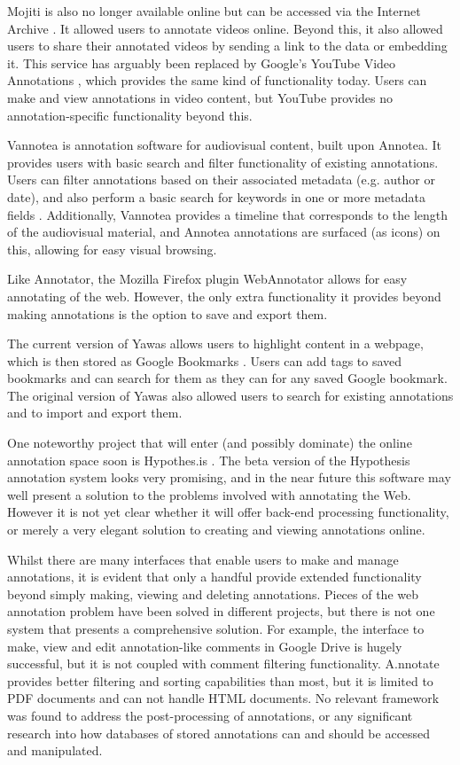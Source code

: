 Mojiti \citep{Mojiti} is also no longer available online but can be accessed via the Internet Archive \citep{InternetArchive}. It allowed users to annotate videos online. Beyond this, it also allowed users to share their annotated videos by sending a link to the data or embedding it. This service has arguably been replaced by Google's YouTube Video Annotations \citep{YouTubeAnns}, which provides the same kind of functionality today. Users can make and view annotations in video content, but YouTube provides no annotation-specific functionality beyond this. 

Vannotea \citep{Vannotea} is annotation software for audiovisual content, built upon Annotea. It provides users with basic search and filter functionality of existing annotations. Users can filter annotations based on their associated metadata (e.g. author or date), and also perform a basic search for keywords in one or more metadata fields \citep{AnnoteaSidebarDoc}. Additionally, Vannotea provides a timeline that corresponds to the length of the audiovisual material, and Annotea annotations are surfaced (as icons) on this, allowing for easy visual browsing. 

Like Annotator, the Mozilla Firefox plugin WebAnnotator \citep{WebAnnotator1} \citep{WebAnnotator2} allows for easy annotating of the web. However, the only extra functionality it provides beyond making annotations is the option to save and export them. 

The current version of Yawas \citep{YawasLink} allows users to highlight content in a webpage, which is then stored as Google Bookmarks \citep{GBookmarks}. Users can add tags to saved bookmarks and can search for them as they can for any saved Google bookmark. The original version of Yawas \citep{Yawas} also allowed users to search for existing annotations and to import and export them. 

One noteworthy project that will enter (and possibly dominate) the online annotation space soon is Hypothes.is \citep{Hypothesis}. The beta version of the Hypothesis annotation system looks very promising, and in the near future this software may well present a solution to the problems involved with annotating the Web. However it is not yet clear whether it will offer back-end processing functionality, or merely a very elegant solution to creating and viewing annotations online.

Whilst there are many interfaces that enable users to make and manage annotations, it is evident that only a handful provide extended functionality beyond simply making, viewing and deleting annotations. Pieces of the web annotation problem have been solved in different projects, but there is not one system that presents a comprehensive solution. For example, the interface to make, view and edit annotation-like comments in Google Drive is hugely successful, but it is not coupled with comment filtering functionality. A.nnotate provides better filtering and sorting capabilities than most, but it is limited to PDF documents and can not handle HTML documents. No relevant framework was found to address the post-processing of annotations, or any significant research into how databases of stored annotations can and should be accessed and manipulated. 

